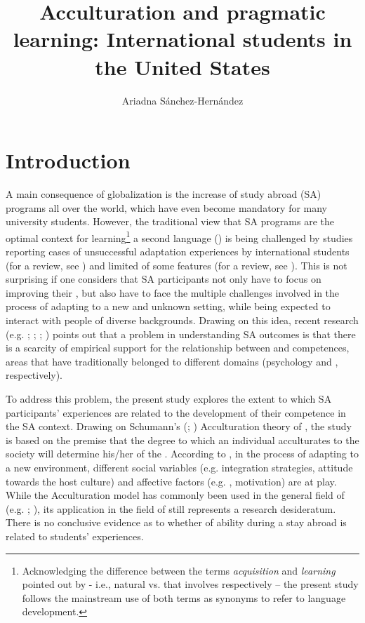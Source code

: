 \documentclass[output=paper]{langsci/langscibook}
\author{Ariadna Sánchez-Hernández\affiliation{Leuphana University Lüneburg}}
\title{Acculturation and pragmatic learning: International students in the United States}
\begin{document}
\section{Introduction}
A main consequence of globalization is the increase of study abroad (SA) programs all over the world, which have even become mandatory for many university students. However, the traditional view that SA programs are the optimal context for learning\footnote{Acknowledging the difference between the terms \textit{acquisition} and \textit{learning} pointed out by \citet{Krashen1985} - i.e., natural  vs.  that involves  respectively – the present study follows the mainstream use of both terms as synonyms to refer to language development.}  a second language () is being challenged by studies reporting cases of unsuccessful adaptation experiences by international students (for a review, see \citealt{MitchellEtAl2015,MitchellEtAl2017}) and limited  of some  features (for a review, see \citealt{TaguchiRoever2017}). This is not surprising if one considers that SA participants not only have to focus on improving their  , but also have to face the multiple challenges involved in the process of adapting to a new and unknown setting, while being expected to interact with people of diverse  backgrounds. Drawing on this idea, recent research (e.g. \citealt{TaguchiEtAl2016}; \citealt{Sykes2017}; \citealt{Taguchi2017}; \citealt{TaguchiRoever2017}) points out that a problem in understanding SA outcomes is that there is a scarcity of empirical support for the relationship between  and  competences, areas that have traditionally belonged to different domains (psychology and , respectively). 

 
To address this problem, the present study explores the extent to which SA participants’  experiences are related to the development of their  competence in the SA context. Drawing on Schumann’s (\citeyear {Schumann1978}; \citeyear{Schumann1986}) Acculturation theory of  , the study is based on the premise that the degree to which an individual acculturates to the  society will determine his/her  of the . According to \citet{Schumann1978}, in the process of adapting to a new environment, different social variables (e.g. integration strategies, attitude towards the host culture) and affective factors (e.g. , motivation) are at play. While the Acculturation model has commonly been used in the general field of   (e.g. \citealt{Hansen1995}; \citealt{Lybeck2002}), its application in the field of   still represents a research desideratum. There is no conclusive evidence as to whether  of  ability during a stay abroad is related to students’  experiences.
 
\end{document}
